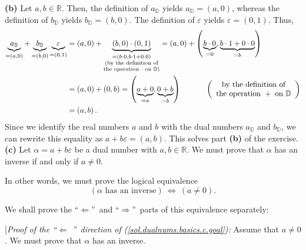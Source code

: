 \documentclass[paper=a4, fontsize=12pt]{scrartcl}%
\theoremstyle{plainsl}
\theoremstyle{definition}
\theoremstyle{remark}
\begin{document}
\textbf{(b)} Let $a,b\in\mathbb{R}$. Then, the definition of $a_{\mathbb{D}} $
yields $a_{\mathbb{D}}=\left(  a,0\right)  $, whereas the definition of
$b_{\mathbb{D}}$ yields $b_{\mathbb{D}}=\left(  b,0\right)  $. The definition
of $\varepsilon$ yields $\varepsilon=\left(  0,1\right)  $. Thus,%
\begin{align*}
\underbrace{a_{\mathbb{D}}}_{=\left(  a,0\right)  }+\underbrace{b_{\mathbb{D}%
}}_{=\left(  b,0\right)  }\underbrace{\varepsilon}_{=\left(  0,1\right)  }  &
=\left(  a,0\right)  +\underbrace{\left(  b,0\right)  \cdot\left(  0,1\right)
} _{\substack{=\left(  b\cdot0,b\cdot1+0\cdot0\right)  \\\text{(by the
definition of} \\\text{the operation }\cdot\text{ on }\mathbb{D}\text{)}%
}}=\left(  a,0\right)  +\left(  \underbrace{b\cdot0}_{=0},\underbrace{b\cdot
1+0\cdot0}_{=b}\right) \\
&  =\left(  a,0\right)  +\left(  0,b\right)  =\left(  \underbrace{a+0}%
_{=a},\underbrace{0+b}_{=b}\right)  \ \ \ \ \ \ \ \ \ \ \left(
\begin{array}
[c]{c}%
\text{by the definition of}\\
\text{the operation }+\text{ on }\mathbb{D}%
\end{array}
\right) \\
&  =\left(  a,b\right)  .
\end{align*}
Since we identify the real numbers $a$ and $b$ with the dual numbers
$a_{\mathbb{D}}$ and $b_{\mathbb{D}}$, we can rewrite this equality as
$a+b\varepsilon=\left(  a,b\right)  $. This solves part \textbf{(b)} of the
exercise.\\[0.4cm]

\textbf{(c)} Let $\alpha=a+b\varepsilon$ be a dual number with $a,b\in
\mathbb{R}$. We must prove that $\alpha$ has an inverse if and only if
$a\neq0$.

In other words, we must prove the logical equivalence%
\begin{equation}
\left(  \alpha\text{ has an inverse}\right)  \ \Longleftrightarrow\ \left(
a\neq0\right)  . \label{sol.dualnums.basics.c.goal}%
\end{equation}


We shall prove the \textquotedblleft$\Longleftarrow$\textquotedblright\ and
\textquotedblleft$\Longrightarrow$\textquotedblright\ parts of this
equivalence separately:

[\textit{Proof of the \textquotedblleft}$\Longleftarrow$%
\textit{\textquotedblright\ direction of (\ref{sol.dualnums.basics.c.goal}):}
Assume that $a\neq0$. We must prove that $\alpha$ has an inverse.
\end{document}
